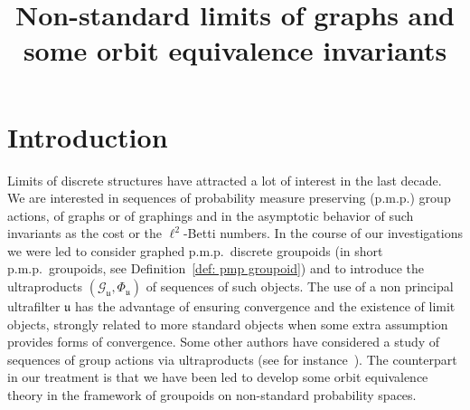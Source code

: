 \documentclass[AHL,Unicode,longabstracts,published]{cedram}
\title[Non-standard limits of graphs, orbit equivalence invariants]{Non-standard limits of graphs and some orbit equivalence invariants}
\author[A.~Carderi]{\firstname{Alessandro} \lastname{Carderi}}
\author[D.~Gaboriau]{\firstname{Damien} \lastname{Gaboriau}}
\author[M.~de la Salle]{\firstname{Mikael} \lastname{de la Salle}}
\newcommand{\cg}{\mathcal{G}}
\newcommand{\ul}{\mathfrak{u}}
\newcommand{\pmp}{p.m.p.\ }
\begin{document}
\maketitle


\tableofcontents



\newpage
\section{Introduction}


Limits of discrete structures have attracted a lot of interest in the last decade. We are interested in sequences of probability measure preserving (p.m.p.) group actions, of graphs or of graphings and in the asymptotic behavior of such invariants as the cost or the $\ell^2$-Betti numbers. In the course of our investigations we were led to consider graphed \pmp discrete groupoids (in short \pmp groupoids, see Definition~\ref{def: pmp groupoid}) and to introduce the ultraproducts $(\cg_\ul, \Phi_\ul)$ of sequences of such objects. The use of a non principal ultrafilter $\ul$ has the advantage of ensuring convergence and the existence of limit objects, strongly related to more standard objects when some extra assumption provides forms of convergence. Some other authors have considered a study of sequences of group actions via ultraproducts (see for instance~\cite{Alekseev-Finn-Sell-sofic-boundaries-2016,Aaserud-Popa,Card-ultra-prod-we-sofic-arxiv,CKTD,Elek-2010-param-test}). The counterpart in our treatment is that we have been led to develop some orbit equivalence theory in the framework of groupoids on non-standard probability spaces.



\end{document}
